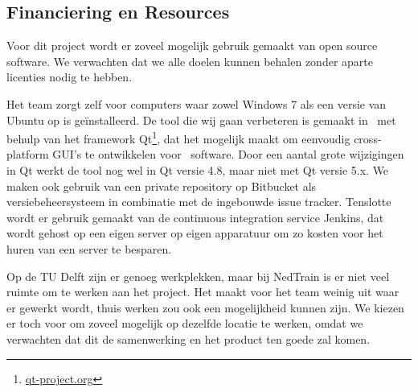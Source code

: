 \subsection{Financiering en Resources}
\label{subsec:resources}
Voor dit project wordt er zoveel mogelijk gebruik gemaakt van open source software. We verwachten dat we alle doelen kunnen behalen zonder aparte licenties nodig te hebben.

Het team zorgt zelf voor computers waar zowel Windows 7 als een versie van Ubuntu op is ge\"installeerd. De tool die wij gaan verbeteren is gemaakt in \cpp\ met behulp van het framework Qt\footnote{\url{qt-project.org}}, dat het mogelijk maakt om eenvoudig cross-platform GUI's te ontwikkelen voor \cpp\ software. Door een aantal grote wijzigingen in Qt werkt de tool nog wel in Qt versie 4.8, maar niet met Qt versie 5.x. We maken ook gebruik van een private repository op Bitbucket als versiebeheersysteem in combinatie met de ingebouwde issue tracker. Tenslotte wordt er gebruik gemaakt van de continuous integration service Jenkins, dat wordt gehost op een eigen server op eigen apparatuur om zo kosten voor het huren van een server te besparen.

Op de TU Delft zijn er genoeg werkplekken, maar bij NedTrain is er niet veel ruimte om te werken aan het project. Het maakt voor het team weinig uit waar er gewerkt wordt, thuis werken zou ook een mogelijkheid kunnen zijn. We kiezen er toch voor om zoveel mogelijk op dezelfde locatie te werken, omdat we verwachten dat dit de samenwerking en het product ten goede zal komen. 
